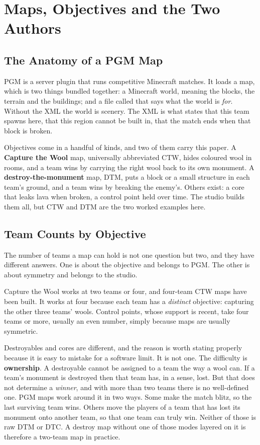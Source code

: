 \chapter{Maps, Objectives and the Two Authors}

\section{The Anatomy of a PGM Map}

PGM is a server plugin that runs competitive Minecraft matches. It loads a map,
which is two things bundled together: a Minecraft world, meaning the blocks, the
terrain and the buildings; and a file called  that says what the world
is \emph{for}. Without the XML the world is scenery. The XML is what states that
this team spawns here, that this region cannot be built in, that the match ends
when that block is broken.

Objectives come in a handful of kinds, and two of them carry this paper. A
\textbf{Capture the Wool} map, universally abbreviated CTW, hides coloured wool in
rooms, and a team wins by carrying the right wool back to its own monument. A
\textbf{destroy-the-monument} map, DTM, puts a block or a small structure in each
team's ground, and a team wins by breaking the enemy's. Others exist: a core that
leaks lava when broken, a control point held over time. The studio builds them
all, but CTW and DTM are the two worked examples here.

\section{Team Counts by Objective}
\label{sec:team-counts}

The number of teams a map can hold is not one question but two, and they have
different answers. One is about the objective and belongs to PGM. The other is
about symmetry and belongs to the studio.

Capture the Wool works at two teams or four, and four-team CTW maps have been
built. It works at four because each team has a \emph{distinct} objective:
capturing the other three teams' wools. Control points, whose support is recent,
take four teams or more, usually an even number, simply because maps are usually
symmetric.

Destroyables and cores are different, and the reason is worth stating properly
because it is easy to mistake for a software limit. It is not one. The difficulty
is \textbf{ownership}. A destroyable cannot be assigned to a team the way a wool
can. If a team's monument is destroyed then that team has, in a sense, lost. But
that does not determine a \emph{winner}, and with more than two teams there is no
well-defined one. PGM maps work around it in two ways. Some make the match blitz,
so the last surviving team wins. Others move the players of a team that has lost
its monument onto another team, so that one team can truly win. Neither of those
is raw DTM or DTC. A destroy map without one of those modes layered on it is
therefore a two-team map in practice.


